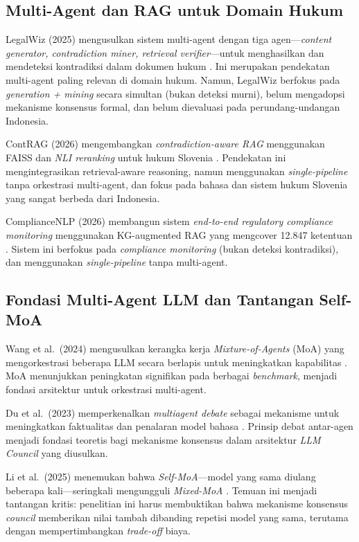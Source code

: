 \subsection{Multi-Agent dan RAG untuk Domain Hukum}

LegalWiz (2025) mengusulkan sistem multi-agent dengan tiga agen—\textit{content generator, contradiction miner, retrieval verifier}—untuk menghasilkan dan mendeteksi kontradiksi dalam dokumen hukum \cite{legalwiz2025}. Ini merupakan pendekatan multi-agent paling relevan di domain hukum. Namun, LegalWiz berfokus pada \textit{generation + mining} secara simultan (bukan deteksi murni), belum mengadopsi mekanisme konsensus formal, dan belum dievaluasi pada perundang-undangan Indonesia.

ContRAG (2026) mengembangkan \textit{contradiction-aware RAG} menggunakan FAISS dan \textit{NLI reranking} untuk hukum Slovenia \cite{contrag2026}. Pendekatan ini mengintegrasikan retrieval-aware reasoning, namun menggunakan \textit{single-pipeline} tanpa orkestrasi multi-agent, dan fokus pada bahasa dan sistem hukum Slovenia yang sangat berbeda dari Indonesia.

ComplianceNLP (2026) membangun sistem \textit{end-to-end regulatory compliance monitoring} menggunakan KG-augmented RAG yang mengcover 12.847 ketentuan \cite{compliancenlp2026}. Sistem ini berfokus pada \textit{compliance monitoring} (bukan deteksi kontradiksi), dan menggunakan \textit{single-pipeline} tanpa multi-agent.

\subsection{Fondasi Multi-Agent LLM dan Tantangan Self-MoA}

Wang et al.\ (2024) mengusulkan kerangka kerja \textit{Mixture-of-Agents} (MoA) yang mengorkestrasi beberapa LLM secara berlapis untuk meningkatkan kapabilitas \cite{wang2024moa}. MoA menunjukkan peningkatan signifikan pada berbagai \textit{benchmark}, menjadi fondasi arsitektur untuk orkestrasi multi-agent.

Du et al.\ (2023) memperkenalkan \textit{multiagent debate} sebagai mekanisme untuk meningkatkan faktualitas dan penalaran model bahasa \cite{du2023}. Prinsip debat antar-agen menjadi fondasi teoretis bagi mekanisme konsensus dalam arsitektur \textit{LLM Council} yang diusulkan.

Li et al.\ (2025) menemukan bahwa \textit{Self-MoA}—model yang sama diulang beberapa kali—seringkali mengungguli \textit{Mixed-MoA} \cite{lismoa2025}. Temuan ini menjadi tantangan kritis: penelitian ini harus membuktikan bahwa mekanisme konsensus \textit{council} memberikan nilai tambah dibanding repetisi model yang sama, terutama dengan mempertimbangkan \textit{trade-off} biaya.

